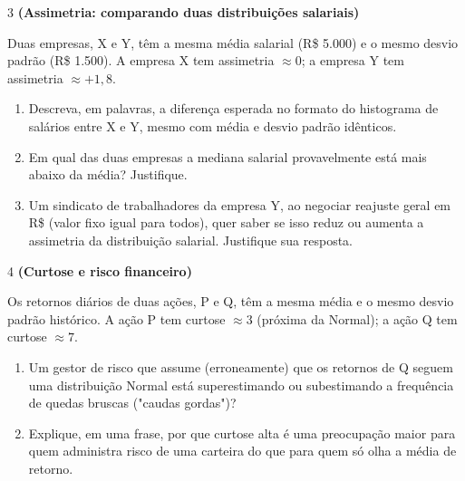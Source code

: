 \documentclass[11pt]{article}
\begin{document}
\begin{questao}{3} \textbf{(Assimetria: comparando duas distribuições salariais)}

Duas empresas, X e Y, têm a mesma média salarial (R\$ 5.000) e o mesmo desvio padrão (R\$ 1.500).
A empresa X tem assimetria $\approx 0$; a empresa Y tem assimetria $\approx +1{,}8$.

\begin{enumerate}[label=(\alph*)]
  \item Descreva, em palavras, a diferença esperada no formato do histograma de salários entre X e
    Y, mesmo com média e desvio padrão idênticos.
  \item Em qual das duas empresas a mediana salarial provavelmente está mais abaixo da média?
    Justifique.
  \item Um sindicato de trabalhadores da empresa Y, ao negociar reajuste geral em R\$ (valor fixo
    igual para todos), quer saber se isso reduz ou aumenta a assimetria da distribuição salarial.
    Justifique sua resposta.
\end{enumerate}
\end{questao}

\begin{questao}{4} \textbf{(Curtose e risco financeiro)}

Os retornos diários de duas ações, P e Q, têm a mesma média e o mesmo desvio padrão histórico. A
ação P tem curtose $\approx 3$ (próxima da Normal); a ação Q tem curtose $\approx 7$.

\begin{enumerate}[label=(\alph*)]
  \item Um gestor de risco que assume (erroneamente) que os retornos de Q seguem uma distribuição
    Normal está superestimando ou subestimando a frequência de quedas bruscas ("caudas gordas")?
  \item Explique, em uma frase, por que curtose alta é uma preocupação maior para quem administra
    risco de uma carteira do que para quem só olha a média de retorno.
\end{enumerate}
\end{questao}
\end{document}
